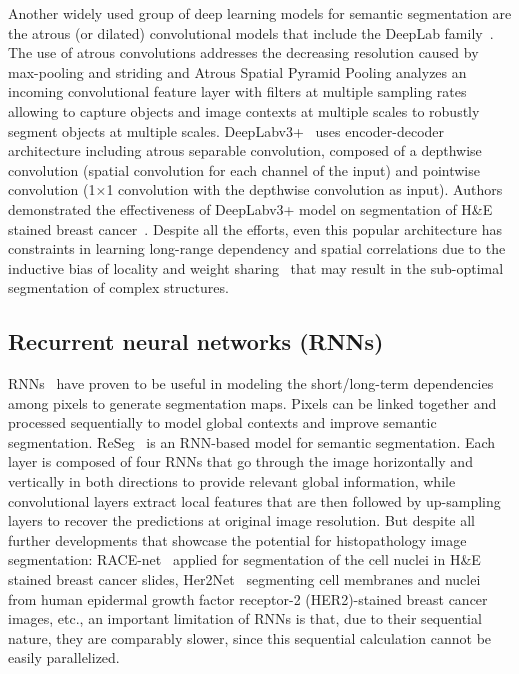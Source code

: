 Another widely used group of deep learning models for semantic segmentation are the atrous (or dilated)
convolutional models that include the DeepLab family~\cite{chen2017deeplab, chen2017rethinking}.
The use of atrous convolutions addresses the decreasing resolution caused by max-pooling and striding and
Atrous Spatial Pyramid Pooling analyzes an incoming convolutional feature layer with filters at multiple
sampling rates allowing to capture objects and image contexts at multiple scales to robustly segment objects
at multiple scales. DeepLabv3+~\cite{chen2018encoder} uses encoder-decoder architecture including atrous
separable convolution, composed of a depthwise convolution (spatial convolution for each channel of the
input) and pointwise convolution (1$\times$1 convolution with the depthwise convolution as input).
Authors~\cite{chen2018encoder} demonstrated the effectiveness of DeepLabv3+ model on
segmentation of H\&E stained breast cancer~\cite{priego2020automatic}. 
Despite all the efforts, even this popular architecture has constraints in learning long-range
dependency and spatial correlations due to the inductive bias of locality and weight
sharing~\cite{xie2021cotr} that may result in the sub-optimal segmentation of complex structures. 

\subsection{Recurrent neural networks (RNNs)}
RNNs~\cite{rumelhart1986learning} have proven to be useful in modeling the short/long-term dependencies
among pixels to generate segmentation maps. Pixels can be linked together and processed sequentially to
model global contexts and improve semantic segmentation. ReSeg~\cite{visin2016reseg} is an RNN-based
model for semantic segmentation. Each layer is composed of four RNNs that go through the image
horizontally and vertically in both directions to provide relevant global information,
while convolutional layers extract local features that are then followed by up-sampling layers
to recover the predictions at original image resolution. But despite all further developments that showcase the potential for
histopathology image segmentation: RACE-net~\cite{chakravarty2018race} applied for segmentation of the
cell nuclei in H\&E stained breast cancer slides, Her2Net~\cite{saha2018her2net} segmenting cell membranes
and nuclei from human epidermal growth factor receptor-2 (HER2)-stained breast cancer images, etc., 
an important limitation of RNNs is that, due to their sequential nature, they are comparably slower,
since this sequential calculation cannot be easily parallelized. 

